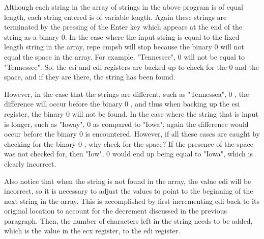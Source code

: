 \documentclass[10pt]{book}
\begin{document}
Although each string in the array of strings in the above program is of equal length, each string entered is of variable length. Again these strings are terminated by the pressing of the Enter key which appears at the end of the string as a binary 0. In the case where the input string is equal to the fixed length string in the array, repe cmpsb will stop because the binary 0 will not equal the space in the array. For example, "Tennessee", 0 will not be equal to "Tennessee". So, the esi and edi registers are backed up to check for the 0 and the space, and if they are there, the string has been found.


However, in the case that the strings are different, such as "Tennessea", 0 , the difference will occur before the binary 0 , and thus when backing up the esi register, the binary 0 will not be found. In the case where the string that is input is longer, such as "Ioway", 0 as compared to "Iowa", again the difference would occur before the binary 0 is encountered. However, if all these cases are caught by checking for the binary 0 , why check for the space? If the presence of the space was not checked for, then "Iow", 0 would end up being equal to "Iowa", which is clearly incorrect.

Also notice that when the string is not found in the array, the value edi will be incorrect, so it is necessary to adjust the values to point to the beginning of the next string in the array. This is accomplished by first incrementing edi back to its original location to account for the decrement discussed in the previous paragraph. Then, the number of characters left in the string needs to be added, which is the value in the ecx register, to the edi register.
\end{document}

